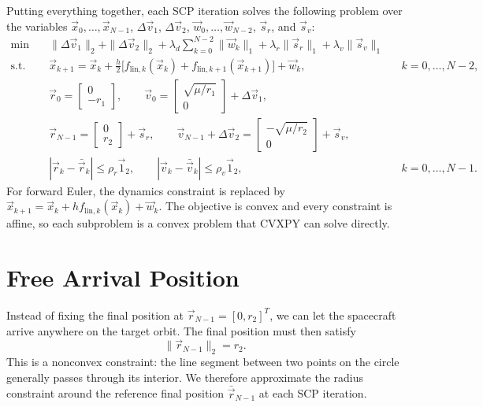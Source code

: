 \documentclass{article}
\begin{document}
Putting everything together, each SCP iteration solves the following problem over the variables $\vec{x}_0,\ldots,\vec{x}_{N-1}$, $\Delta\vec{v}_1$, $\Delta\vec{v}_2$, $\vec{w}_0,\ldots,\vec{w}_{N-2}$, $\vec{s}_r$, and $\vec{s}_v$:
\[
\boxed{
\begin{aligned}
\min\quad &\|\Delta\vec{v}_1\|_2+\|\Delta\vec{v}_2\|_2
+\lambda_d\sum_{k=0}^{N-2}\|\vec{w}_k\|_1
+\lambda_r\|\vec{s}_r\|_1
+\lambda_v\|\vec{s}_v\|_1\\[4pt]
\text{s.t.}\quad
&\vec{x}_{k+1}=\vec{x}_k+\frac{h}{2}\bigl[f_{\mathrm{lin},k}(\vec{x}_k)+f_{\mathrm{lin},k+1}(\vec{x}_{k+1})\bigr]+\vec{w}_k,
&&k=0,\ldots,N-2,\\
&\vec{r}_0=\begin{bmatrix}0\\-r_1\end{bmatrix},
\qquad
\vec{v}_0=\begin{bmatrix}\sqrt{\mu/r_1}\\0\end{bmatrix}+\Delta\vec{v}_1,\\
&\vec{r}_{N-1}=\begin{bmatrix}0\\r_2\end{bmatrix}+\vec{s}_r,
\qquad
\vec{v}_{N-1}+\Delta\vec{v}_2=\begin{bmatrix}-\sqrt{\mu/r_2}\\0\end{bmatrix}+\vec{s}_v,\\
&|\vec{r}_k-\bar{\vec{r}}_k|\le\rho_r\vec{1}_2,
\qquad
|\vec{v}_k-\bar{\vec{v}}_k|\le\rho_v\vec{1}_2,
&&k=0,\ldots,N-1.
\end{aligned}
}
\]
For forward Euler, the dynamics constraint is replaced by $\vec{x}_{k+1}=\vec{x}_k+h f_{\mathrm{lin},k}(\vec{x}_k)+\vec{w}_k$. The objective is convex and every constraint is affine, so each subproblem is a convex problem that CVXPY can solve directly.

\section{Free Arrival Position}

Instead of fixing the final position at $\vec{r}_{N-1}=[0,r_2]^T$, we can let the spacecraft arrive anywhere on the target orbit. The final position must then satisfy
\[
\|\vec{r}_{N-1}\|_2=r_2.
\]
This is a nonconvex constraint: the line segment between two points on the circle generally passes through its interior. We therefore approximate the radius constraint around the reference final position $\bar{\vec{r}}_{N-1}$ at each SCP iteration.
\end{document}
